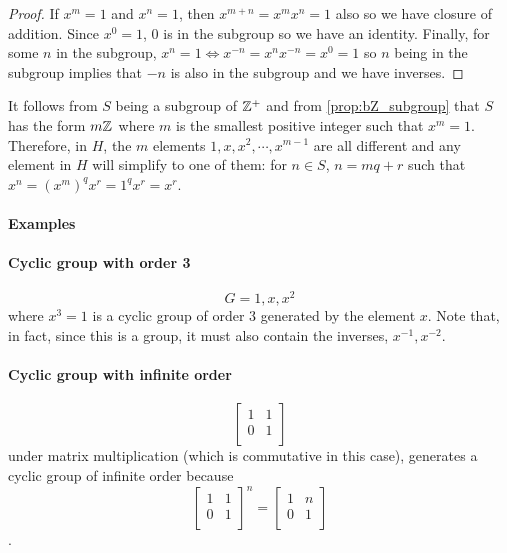 \documentclass[MathsNotesBase.tex]{subfiles}
\begin{document}
{		
		\begin{proof}
			If $x^m = 1$ and $x^n = 1$, then $x^{m+n} = x^mx^n = 1$ also so we have closure of addition. Since $x^0 = 1$, 0 is in the subgroup so we have an identity. Finally, for some $n$ in the subgroup, $x^n = 1 \iff x^{-n} = x^nx^{-n} = x^0 = 1$ so $n$ being in the subgroup implies that $-n$ is also in the subgroup and we have inverses.
		\end{proof}
		\begin{corollary}
			It follows from $S$ being a subgroup of $\mathbb{Z}^{+}$ and from \autoref{prop:bZ_subgroup} that $S$ has the form $m\mathbb{Z}^{}$ where $m$ is the smallest positive integer such that $x^m = 1$. Therefore, in $H$, the $m$ elements $1, x, x^2, \cdots , x^{m-1}$ are all different and any element in $H$ will simplify to one of them: for $n \in S$, $n = mq + r$ such that $x^n = (x^m)^qx^r = 1^qx^r = x^r$.
		\end{corollary}
		
		\paragraph{Examples}
		\paragraph{Cyclic group with order 3}
		\[ G = {1, x, x^2} \]
		where $x^3 = 1$ is a cyclic group of order 3 generated by the element $x$. Note that, in fact, since this is a group, it must also contain the inverses, $x^{-1}, x^{-2}$. 
		\paragraph{Cyclic group with infinite order}
		\[
			\begin{bmatrix}
			1 & 1	\\
			0 & 1 	\\
			\end{bmatrix} 
		\]
		under matrix multiplication (which is commutative in this case), generates a cyclic group of infinite order because
		\[
			\begin{bmatrix}
			1 & 1	\\
			0 & 1 	\\
			\end{bmatrix}^n =
			\begin{bmatrix}
			1 & n	\\
			0 & 1 	\\
			\end{bmatrix}
		\].
}
\end{document}
